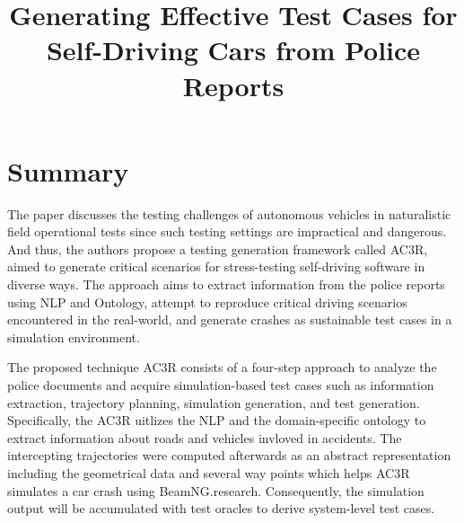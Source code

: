 \documentclass[10pt,a4paper]{report}
\title{Generating Effective Test Cases for Self-Driving Cars from Police Reports}
\begin{document}
\begin{center}
\textbf{\thetitle}
\end{center}


\section{Summary}
The paper discusses the testing challenges of autonomous vehicles in naturalistic field operational tests since such testing settings are impractical and dangerous. 
%
And thus, the authors propose a testing generation framework called AC3R, aimed to generate critical scenarios for stress-testing self-driving software in diverse ways.
%
The approach aims to extract information from the police reports using NLP and Ontology, attempt to reproduce critical driving scenarios encountered in the real-world, and generate crashes as sustainable test cases in a simulation environment.
%

The proposed technique AC3R consists of a four-step approach to analyze the police documents and acquire simulation-based test cases such as information extraction, trajectory planning, simulation generation, and test generation.
%
Specifically, the AC3R uitlizes the NLP and the domain-specific ontology to extract information about roads and vehicles invloved in accidents.
%
The intercepting trajectories were computed afterwards as an abstract representation including the geometrical data and several way points which helps AC3R simulates a car crash using BeamNG.research.
%
Consequently, the simulation output will be accumulated with test oracles to derive system-level test cases.
%


%
\end{document}
